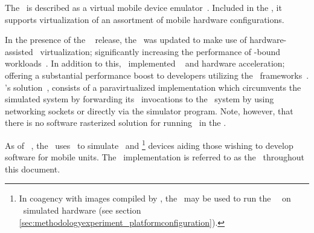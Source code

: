 The \dvttermandroidemulator\ is described as a virtual mobile device emulator~.
Included in the \dvttermandroidsdk , it supports virtualization of an assortment of mobile hardware configurations.

In the presence of the \dvttermandroid\  release, the \dvttermandroidsdk\ was updated to make use of hardware-assisted \dvttermxeightysix\ virtualization; significantly increasing the performance of \dvttermcpu -bound workloads~.
In addition to this, \dvttermgoogle\ implemented \dvttermopengles\  and  hardware acceleration; offering a substantial performance boost to developers utilizing the \dvttermopengles\ frameworks~.
\dvttermgoogle 's solution~, consists of a paravirtualized implementation which circumvents the simulated system by forwarding its \dvttermopengles\ invocations to the \dvttermhost\ system by using networking sockets or directly via the simulator program.
Note, however, that there is no software rasterized solution for running \dvttermopenglestwopointo\ in the \dvttermandroidemulator .

As of \dvttermandroid\ , the \dvttermandroidemulator\ uses \dvttermqemu\ to simulate \dvttermarm\ and \dvttermxeightysix \footnote{In coagency with images compiled by \dvttermintel , the \dvttermandroidemulator\ may be used to run the \dvttermandroid\ \dvttermos\ on \dvttermxeightysix\ simulated hardware (see section \ref{sec:methodologyexperiment_platformconfiguration}).} devices aiding those wishing to develop software for mobile units.
The \dvttermandroidemulator\ implementation is referred to as the \dvttermreferencesolution\ throughout this document.
